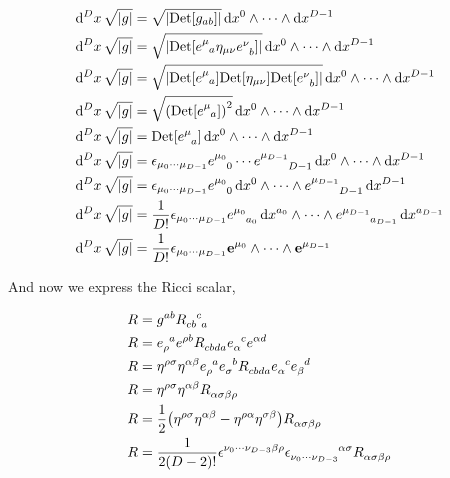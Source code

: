 \begin{align*}
    \dd[D]{x}\sqrt{\abs{g}}&=\sqrt{\abs{\Det\qty[g_{ab}]}}\dd{x^0}\wedge\cdots\wedge\dd{x^{D-1}}\\
    \dd[D]{x}\sqrt{\abs{g}}&=\sqrt{\abs{\Det\qty[\tensor{e}{^\mu_a}\eta_{\mu\nu}\tensor{e}{^\nu_b}]}}\dd{x^0}\wedge\cdots\wedge\dd{x^{D-1}}\\
    \dd[D]{x}\sqrt{\abs{g}}&=\sqrt{\abs{\Det\qty[\tensor{e}{^\mu_a}]\Det\qty[\eta_{\mu\nu}]\Det\qty[\tensor{e}{^\nu_b}]}}\dd{x^0}\wedge\cdots\wedge\dd{x^{D-1}}\\
    \dd[D]{x}\sqrt{\abs{g}}&=\sqrt{\qty(\Det\qty[\tensor{e}{^\mu_a}])^2}\dd{x^0}\wedge\cdots\wedge\dd{x^{D-1}}\\
    \dd[D]{x}\sqrt{\abs{g}}&=\Det\qty[\tensor{e}{^\mu_a}]\dd{x^0}\wedge\cdots\wedge\dd{x^{D-1}}\\
    \dd[D]{x}\sqrt{\abs{g}}&=\epsilon_{\mu_0\cdots\mu_{D-1}}\tensor{e}{^{\mu_0}_0}\cdots\tensor{e}{^{\mu_{D-1}}_{D-1}}\dd{x^0}\wedge\cdots\wedge\dd{x^{D-1}}\\
    \dd[D]{x}\sqrt{\abs{g}}&=\epsilon_{\mu_0\cdots\mu_{D-1}}\tensor{e}{^{\mu_0}_0}\dd{x^0}\wedge\cdots\wedge\tensor{e}{^{\mu_{D-1}}_{D-1}}\dd{x^{D-1}}\\
    \dd[D]{x}\sqrt{\abs{g}}&=\frac{1}{D!}\epsilon_{\mu_0\cdots\mu_{D-1}}\tensor{e}{^{\mu_0}_{a_0}}\dd{x^{a_0}}\wedge\cdots\wedge\tensor{e}{^{\mu_{D-1}}_{a_{D-1}}}\dd{x^{a_{D-1}}}\\
    \dd[D]{x}\sqrt{\abs{g}}&=\frac{1}{D!}\epsilon_{\mu_0\cdots\mu_{D-1}}\vb e^{\mu_0}\wedge\cdots\wedge\vb e^{\mu_{D-1}}
\end{align*}

And now we express the Ricci scalar,

\begin{align*}
    R&=g^{ab}\tensor{R}{_c_b^c_a}\\
    R&=\tensor{e}{_\rho^a}\tensor{e}{^\rho^b}\tensor{R}{_c_b_d_a}\tensor{e}{_\alpha^c}\tensor{e}{^\alpha^d}\\
    R&=\eta^{\rho\sigma}\eta^{\alpha\beta}\tensor{e}{_\rho^a}\tensor{e}{_\sigma^b}\tensor{R}{_c_b_d_a}\tensor{e}{_\alpha^c}\tensor{e}{_\beta^d}\\
    R&=\eta^{\rho\sigma}\eta^{\alpha\beta}\tensor{R}{_\alpha_\sigma_\beta_\rho}\\
    R&=\frac12\qty(\eta^{\rho\sigma}\eta^{\alpha\beta}-\eta^{\rho\alpha}\eta^{\sigma\beta})\tensor{R}{_\alpha_\sigma_\beta_\rho}\\
    R&=\frac{1}{2\qty(D-2)!}\tensor{\epsilon}{^{\nu_0}^\cdots^{\nu_{D-3}}^\beta^\rho}\tensor{\epsilon}{_{\nu_0}_\cdots_{\nu_{D-3}}^\alpha^\sigma}\tensor{R}{_\alpha_\sigma_\beta_\rho}
\end{align*}

